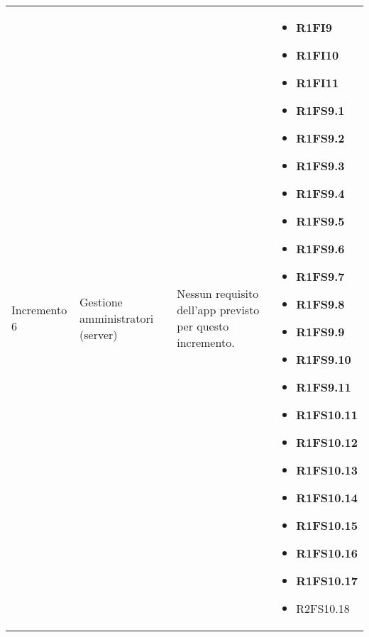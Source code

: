 {\begin{longtable}{C{3cm} C{4cm} C{4cm} C{4cm}}
Incremento 6 & Gestione amministratori (server) & 
    Nessun requisito dell'app previsto per questo incremento.
& \begin{itemize}
    \item[ ] \textbf{R1FI9}
    \item[ ] \textbf{R1FI10}
    \item[ ] \textbf{R1FI11}
    \item[ ] \textbf{R1FS9.1}
    \item[ ] \textbf{R1FS9.2}
    \item[ ] \textbf{R1FS9.3}
    \item[ ] \textbf{R1FS9.4}
    \item[ ] \textbf{R1FS9.5}
    \item[ ] \textbf{R1FS9.6}
    \item[ ] \textbf{R1FS9.7}
    \item[ ] \textbf{R1FS9.8}
    \item[ ] \textbf{R1FS9.9}
    \item[ ] \textbf{R1FS9.10}
    \item[ ] \textbf{R1FS9.11}
    \item[ ] \textbf{R1FS10.11}
    \item[ ] \textbf{R1FS10.12}
    \item[ ] \textbf{R1FS10.13}
    \item[ ] \textbf{R1FS10.14}
    \item[ ] \textbf{R1FS10.15}
    \item[ ] \textbf{R1FS10.16}
    \item[ ] \textbf{R1FS10.17}
    \item[ ] R2FS10.18
\end{itemize}\\

\end{longtable}
}